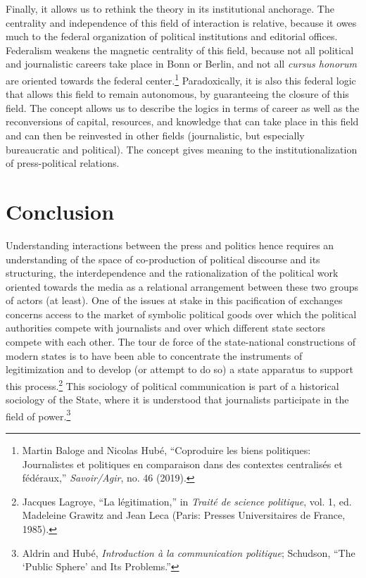 \documentclass{tufte-handout}
\begin{document}
Finally, it allows us to rethink the theory in its institutional
anchorage. The centrality and independence of this field of interaction
is relative, because it owes much to the federal organization of
political institutions and editorial offices. Federalism weakens the
magnetic centrality of this field, because not all political and
journalistic careers take place in Bonn or Berlin, and not all
\emph{cursus honorum} are oriented towards the federal
center.\footnote{Martin Baloge and Nicolas Hubé, ``Coproduire les biens
  politiques: Journalistes et politiques en comparaison dans des
  contextes centralisés et fédéraux,'' \emph{Savoir/Agir}, no. 46
  (2019).} Paradoxically, it is also this federal logic that allows this
field to remain autonomous, by guaranteeing the closure of this field.
The concept allows us to describe the logics in terms of career as well
as the reconversions of capital, resources, and knowledge that can take
place in this field and can then be reinvested in other fields
(journalistic, but especially bureaucratic and political). The concept
gives meaning to the institutionalization of press-political relations.

\hypertarget{conclusion}{%
\section{Conclusion}\label{conclusion}}

Understanding interactions between the press and politics hence requires
an understanding of the space of co-production of political discourse
and its structuring, the interdependence and the rationalization of the
political work oriented towards the media as a relational arrangement
between these two groups of actors (at least). One of the issues at
stake in this pacification of exchanges concerns access to the market of
symbolic political goods over which the political authorities compete
with journalists and over which different state sectors compete with
each other. The tour de force of the state-national constructions of
modern states is to have been able to concentrate the instruments of
legitimization and to develop (or attempt to do so) a state apparatus to
support this process.\footnote{Jacques Lagroye, ``La légitimation,'' in
  \emph{Traité de science politique}, vol. 1, ed. Madeleine Grawitz and
  Jean Leca (Paris: Presses Universitaires de France, 1985).} This
sociology of political communication is part of a historical sociology
of the State, where it is understood that journalists participate in the
field of power.\footnote{Aldrin and Hubé, \emph{Introduction à la
  communication politique}; Schudson, ``The `Public Sphere' and Its
  Problems.''}
\end{document}
